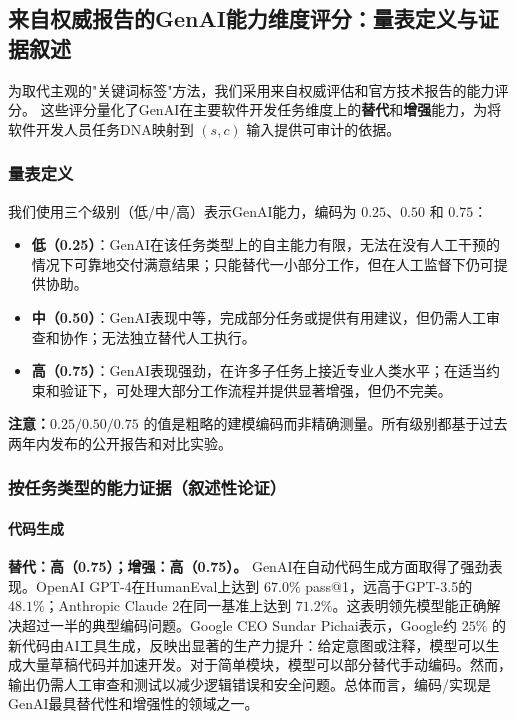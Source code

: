 \subsection{来自权威报告的GenAI能力维度评分：量表定义与证据叙述}

为取代主观的"关键词标签"方法，我们采用来自权威评估和官方技术报告的能力评分。
这些评分量化了GenAI在主要软件开发任务维度上的\textbf{替代}和\textbf{增强}能力，为将软件开发人员任务DNA映射到 $(s,c)$ 输入提供可审计的依据。

\subsubsection{量表定义}

我们使用三个级别（低/中/高）表示GenAI能力，编码为 $0.25$、$0.50$ 和 $0.75$：
\begin{itemize}
    \item \textbf{低（0.25）}：GenAI在该任务类型上的自主能力有限，无法在没有人工干预的情况下可靠地交付满意结果；只能替代一小部分工作，但在人工监督下仍可提供协助。
    \item \textbf{中（0.50）}：GenAI表现中等，完成部分任务或提供有用建议，但仍需人工审查和协作；无法独立替代人工执行。
    \item \textbf{高（0.75）}：GenAI表现强劲，在许多子任务上接近专业人类水平；在适当约束和验证下，可处理大部分工作流程并提供显著增强，但仍不完美。
\end{itemize}

\noindent\textbf{注意：}$0.25/0.50/0.75$ 的值是粗略的建模编码而非精确测量。所有级别都基于过去两年内发布的公开报告和对比实验。

\subsubsection{按任务类型的能力证据（叙述性论证）}

\paragraph{代码生成}
\textbf{替代：高（0.75）；增强：高（0.75）。}
GenAI在自动代码生成方面取得了强劲表现。OpenAI GPT-4在HumanEval上达到 $67.0\%$ pass@1，远高于GPT-3.5的 $48.1\%$；Anthropic Claude 2在同一基准上达到 $71.2\%$。这表明领先模型能正确解决超过一半的典型编码问题。Google CEO Sundar Pichai表示，Google约 $25\%$ 的新代码由AI工具生成，反映出显著的生产力提升：给定意图或注释，模型可以生成大量草稿代码并加速开发。对于简单模块，模型可以部分替代手动编码。然而，输出仍需人工审查和测试以减少逻辑错误和安全问题。总体而言，编码/实现是GenAI最具替代性和增强性的领域之一。

